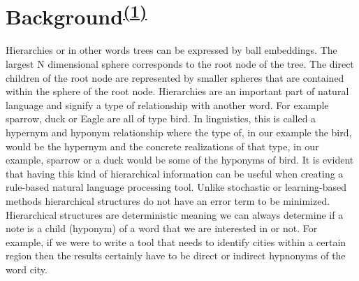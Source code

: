 \chapter[Background]{Background\textsuperscript{\hyperref[Jan]{(1)}}}
\label{sec::ball}
Hierarchies or in other words trees can be expressed by ball embeddings. The largest N dimensional sphere corresponds to the root node of the tree. The direct children of the root node are represented by smaller spheres that are contained within the sphere of the root node. Hierarchies are an important part of natural language and signify a type of relationship with another word. For example sparrow, duck or Eagle are all of type bird. In linguistics, this is called a hypernym and hyponym relationship where the type of, in our example the bird, would be the hypernym and the concrete realizations of that type, in our example, sparrow or a duck would be some of the hyponyms of bird. It is evident that having this kind of hierarchical information can be useful when creating a rule-based natural language processing tool. Unlike stochastic or learning-based methods hierarchical structures do not have an error term to be minimized. Hierarchical structures are deterministic meaning we can always determine if a note is a child (hyponym) of a word that we are interested in or not. For example, if we were to write a tool that needs to identify cities within a certain region then the results certainly have to be direct or indirect hypnonyms of the word city.

